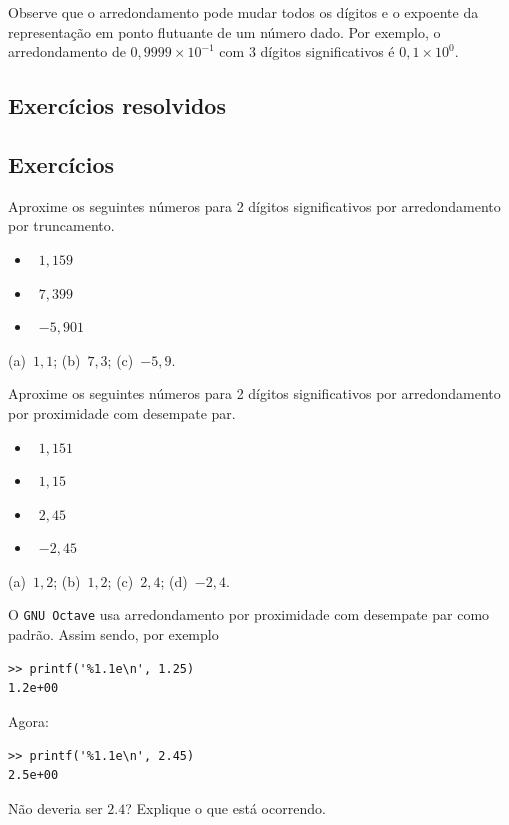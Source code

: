 \begin{obs}
  Observe que o arredondamento pode mudar todos os dígitos e o expoente da representação em ponto flutuante de um número dado. Por exemplo, o arredondamento de $0,9999\times 10^{-1}$ com $3$ dígitos significativos é $0,1\times 10^{0}$.
\end{obs}

\subsection*{Exercícios resolvidos}

\construirExeresol

\subsection*{Exercícios}

\begin{exer}
  Aproxime os seguintes números para 2 dígitos significativos por arredondamento por truncamento.
  \begin{itemize}
  \item[(a)]~$1,159$
  \item[(b)]~$7,399$
  \item[(c)]~$-5,901$
  \end{itemize}
\end{exer}
\begin{resp}
  (a)~$1,1$; (b)~$7,3$; (c)~$-5,9$.
\end{resp}

\begin{exer}
  Aproxime os seguintes números para 2 dígitos significativos por arredondamento por proximidade com desempate par.
  \begin{itemize}
  \item[(a)]~$1,151$
  \item[(b)]~$1,15$
  \item[(c)]~$2,45$
  \item[(d)]~$-2,45$
  \end{itemize}
\end{exer}
\begin{resp}
  (a)~$1,2$; (b)~$1,2$; (c)~$2,4$; (d)~$-2,4$.
\end{resp}

\begin{exer}
  O \verb+GNU Octave+ usa arredondamento por proximidade com desempate
  par como padrão. Assim sendo, por exemplo
\begin{verbatim}
>> printf('%1.1e\n', 1.25)
1.2e+00
\end{verbatim}
  Agora:
\begin{verbatim}
>> printf('%1.1e\n', 2.45)
2.5e+00
\end{verbatim}
  Não deveria ser $2.4$? Explique o que está ocorrendo.
\end{exer}
\begin{resp}
  \construirResp
\end{resp}



